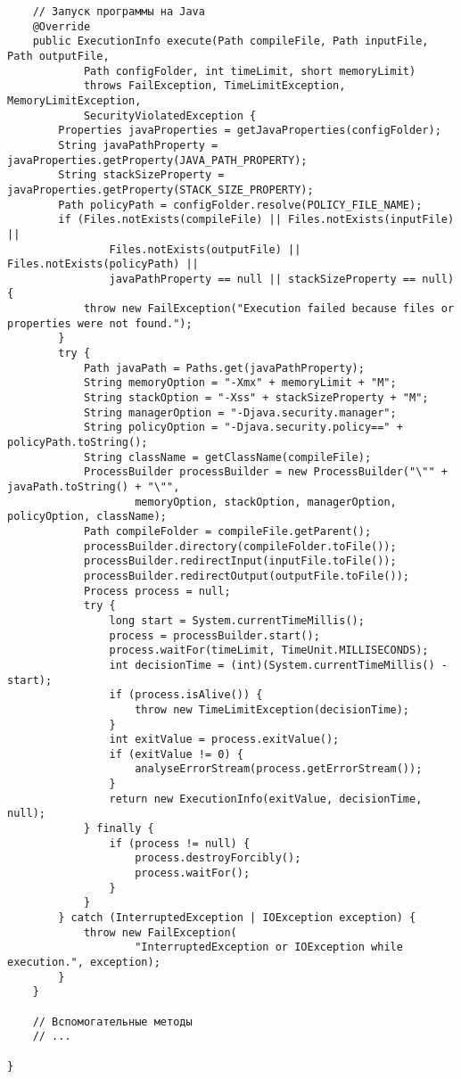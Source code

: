 \begin{verbatim}
    // Запуск программы на Java
    @Override
    public ExecutionInfo execute(Path compileFile, Path inputFile, Path outputFile,
            Path configFolder, int timeLimit, short memoryLimit)
            throws FailException, TimeLimitException, MemoryLimitException,
            SecurityViolatedException {
        Properties javaProperties = getJavaProperties(configFolder);
        String javaPathProperty = javaProperties.getProperty(JAVA_PATH_PROPERTY);
        String stackSizeProperty = javaProperties.getProperty(STACK_SIZE_PROPERTY);
        Path policyPath = configFolder.resolve(POLICY_FILE_NAME);
        if (Files.notExists(compileFile) || Files.notExists(inputFile) ||
                Files.notExists(outputFile) || Files.notExists(policyPath) ||
                javaPathProperty == null || stackSizeProperty == null) {
            throw new FailException("Execution failed because files or properties were not found.");
        }
        try {
            Path javaPath = Paths.get(javaPathProperty);
            String memoryOption = "-Xmx" + memoryLimit + "M";
            String stackOption = "-Xss" + stackSizeProperty + "M";
            String managerOption = "-Djava.security.manager";
            String policyOption = "-Djava.security.policy==" + policyPath.toString();
            String className = getClassName(compileFile);
            ProcessBuilder processBuilder = new ProcessBuilder("\"" + javaPath.toString() + "\"",
                    memoryOption, stackOption, managerOption, policyOption, className);
            Path compileFolder = compileFile.getParent();
            processBuilder.directory(compileFolder.toFile());
            processBuilder.redirectInput(inputFile.toFile());
            processBuilder.redirectOutput(outputFile.toFile());
            Process process = null;
            try {
                long start = System.currentTimeMillis();
                process = processBuilder.start();
                process.waitFor(timeLimit, TimeUnit.MILLISECONDS);
                int decisionTime = (int)(System.currentTimeMillis() - start);
                if (process.isAlive()) {
                    throw new TimeLimitException(decisionTime);
                }
                int exitValue = process.exitValue();
                if (exitValue != 0) {
                    analyseErrorStream(process.getErrorStream());
                }
                return new ExecutionInfo(exitValue, decisionTime, null);
            } finally {
                if (process != null) {
                    process.destroyForcibly();
                    process.waitFor();
                }
            }
        } catch (InterruptedException | IOException exception) {
            throw new FailException(
                    "InterruptedException or IOException while execution.", exception);
        }
    }
    
    // Вспомогательные методы
    // ...

}
\end{verbatim}

